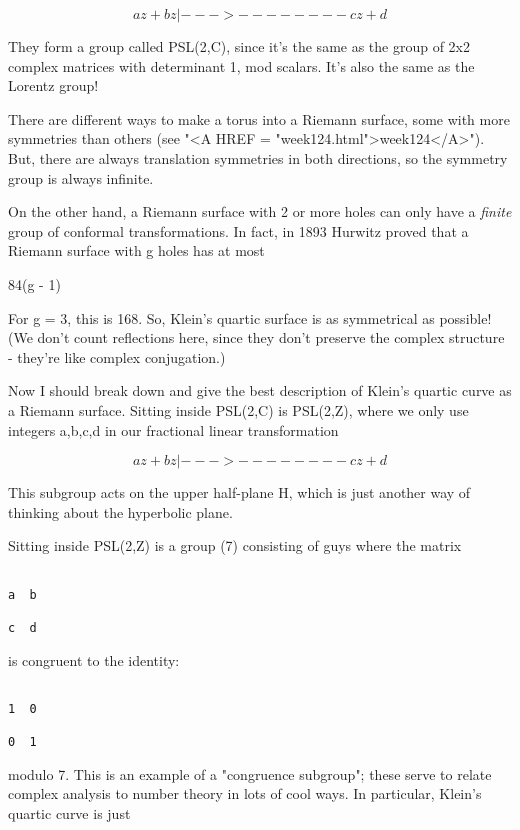 $$

           az + b
z |--->   --------
           cz + d
$$
    
They form a group called PSL(2,C), since it's the same as the group of
2x2 complex matrices with determinant 1, mod scalars.  It's also the 
same as the Lorentz group!  

There are different ways to make a torus into a Riemann surface,
some with more symmetries than others (see "<A HREF = "week124.html">week124</A>").  But, there 
are always translation symmetries in both directions, so the symmetry 
group is always infinite. 

On the other hand, a Riemann surface with 2 or more holes can only 
have a \emph{finite} group of conformal transformations.  In fact, in 1893 
Hurwitz proved that a Riemann surface with g holes has at most 

84(g - 1)

For g = 3, this is 168.  So, Klein's quartic surface is as symmetrical 
as possible!  (We don't count reflections here, since they don't 
preserve the complex structure - they're like complex conjugation.)

Now I should break down and give the best description of Klein's
quartic curve as a Riemann surface.  Sitting inside PSL(2,C) is
PSL(2,Z), where we only use integers a,b,c,d in our fractional linear 
transformation


$$

           az + b
z |--->   --------
           cz + d 
$$
    
This subgroup acts on the upper half-plane H, which is just another
way of thinking about the hyperbolic plane.

Sitting inside PSL(2,Z) is a group \Gamma (7) consisting of guys where 
the matrix 


\begin{verbatim}

a  b

c  d 
\end{verbatim}
    
is congruent to the identity:


\begin{verbatim}

1  0

0  1
\end{verbatim}
    
modulo 7.  This is an example of a "congruence subgroup"; these serve
to relate complex analysis to number theory in lots of cool ways.
In particular, Klein's quartic curve is just

